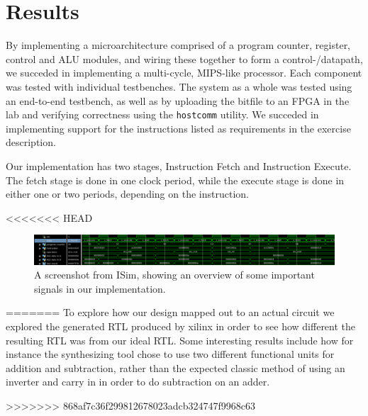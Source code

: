 \chapter{Results}

By implementing a microarchitecture comprised of a program counter, register, control and ALU modules, and wiring these together to form a control-/datapath, we succeded in implementing a multi-cycle, MIPS-like processor.
Each component was tested with individual testbenches.
The system as a whole was tested using an end-to-end testbench, as well as by uploading the bitfile to an FPGA in the lab and verifying correctness using the \texttt{hostcomm} utility.
We succeded in implementing support for the instructions listed as requirements in the exercise description.

Our implementation has two stages, Instruction Fetch and Instruction Execute.
The fetch stage is done in one clock period, while the execute stage is done in either one or two periods, depending on the instruction.

<<<<<<< HEAD
\begin{figure}[h!]
    \includegraphics[width=\linewidth]{img/overview_sim.png}
    \caption{A screenshot from ISim, showing an overview of some important signals in our implementation.}
    \label{fig:waves}
\end{figure}
=======
To explore how our design mapped out to an actual circuit we explored the generated RTL produced by xilinx in order to see how different the resulting RTL was from our ideal RTL.
Some interesting results include how for instance the synthesizing tool chose to use two different functional units for addition and subtraction, rather than the expected classic method of using an inverter and carry in in order to do subtraction on an adder.

>>>>>>> 868af7c36f299812678023adcb324747f9968c63
